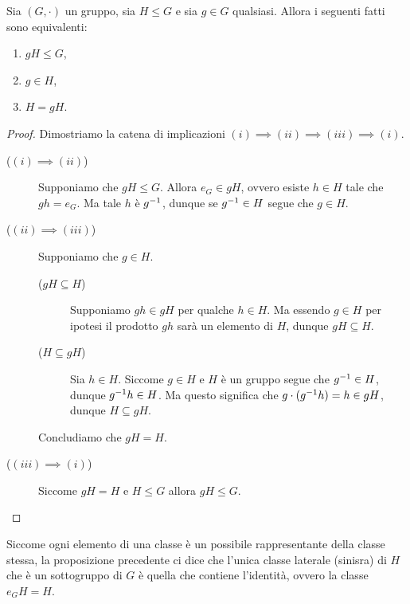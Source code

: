 \begin{proposition}\label{prop:cond_laterale_è_sgrp}
    Sia $(G, \cdot)$ un gruppo, sia $H \leq G$ e sia $g \in G$ qualsiasi. Allora i seguenti fatti sono equivalenti:
    \begin{enumerate}[label={(\roman*)}]
        \item $gH \leq G$,
        \item $g \in H$,
        \item $H = gH$.
    \end{enumerate}
\end{proposition}
\begin{proof}
    Dimostriamo la catena di implicazioni $(i) \implies (ii) \implies (iii) \implies (i)$.
    \begin{description}
        \item[($(i) \implies (ii)$)] Supponiamo che $gH \leq G$. Allora $e_G \in gH$, ovvero esiste $h \in H$ tale che $gh = e_G$. Ma tale $h$ è $g^{-1}$, dunque se $g^{-1} \in H$ segue che $g \in H$.
        \item[($(ii) \implies (iii)$)] Supponiamo che $g \in H$. 
        \begin{description}
            \item[($gH \subseteq H$)] Supponiamo $gh \in gH$ per qualche $h \in H$. Ma essendo $g \in H$ per ipotesi il prodotto $gh$ sarà un elemento di $H$, dunque $gH \subseteq H$.
            \item[($H \subseteq gH$)] Sia $h \in H$. Siccome $g \in H$ e $H$ è un gruppo segue che $g^{-1} \in H$, dunque $g^{-1} h \in H$. Ma questo significa che $g\cdot(g^{-1} h) = h \in gH$, dunque $H \subseteq gH$.
        \end{description}
        Concludiamo che $gH = H$.
        \item[($(iii) \implies (i)$)] Siccome $gH = H$ e $H \leq G$ allora $gH \leq G$. \qedhere 
    \end{description}
\end{proof}

Siccome ogni elemento di una classe è un possibile rappresentante della classe stessa, la proposizione precedente ci dice che l'unica classe laterale (sinisra) di $H$ che è un sottogruppo di $G$ è quella che contiene l'identità, ovvero la classe $e_GH = H$.

